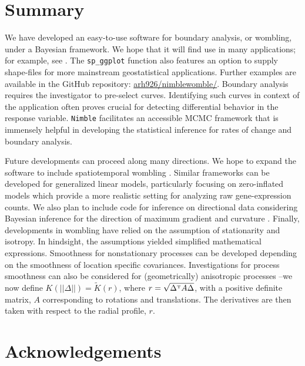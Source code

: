 \section{Summary}
We have developed an easy-to-use software for boundary analysis, or wombling, under a Bayesian framework. %
We hope that it will find use in many applications; for example, see \cite{banerjee2006bayesian,halder2024bayesian}. The \texttt{sp\_ggplot} function also features an option to supply shape-files for more mainstream geostatistical applications. Further examples are available in the GitHub repository: \href{https://github.com/arh926/nimblewomble/}{arh926/nimblewomble/}. Boundary analysis requires the investigator to pre-select curves. Identifying such curves in context of the application often proves crucial for detecting differential behavior in the response variable. \texttt{Nimble} facilitates an accessible MCMC framework that is immensely helpful in developing the statistical inference for rates of change and boundary analysis.

Future developments can proceed along many directions. We hope to expand the software to include spatiotemporal wombling \citep[see, e.g.,][]{halder2024bayesian}. Similar frameworks can be developed for generalized linear models, particularly focusing on zero-inflated models \citep[see, e.g.][]{finley_hierarchical_2011, halder2021spatial} which provide a more realistic setting for analyzing raw gene-expression counts. We also plan to include code for inference on directional data considering Bayesian inference for the direction of maximum gradient and curvature \citep[see, e.g.,][]{wang2014projected,wang_process_2018}. { Finally, developments in wombling have relied on the assumption of stationarity and isotropy. In hindsight, the assumptions yielded simplified mathematical expressions. Smoothness for nonstationary processes can be developed \citep[see, e.g.][]{paciorek2006spatial} depending on the smoothness of location specific covariances. Investigations for process smoothness can also be considered for (geometrically) anisotropic processes \citep[see, e.g.,][]{allard2016anisotropy}--we now define $K(||\Delta||)=\widetilde{K}(r)$, where $r=\sqrt{\Delta^{\mathrm{\scriptscriptstyle T}}A\Delta}$, with a positive definite matrix, $A$ corresponding to rotations and translations. The derivatives are then taken with respect to the radial profile, $r$.} 

\section*{Acknowledgements}

